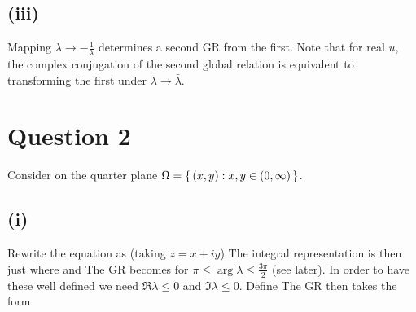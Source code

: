 \documentclass{article}
\begin{document}
\subsection{(iii)}
Mapping $\lambda \to -\frac{1}{\lambda}$ determines a second GR from the first. 
Note that for real $u$, the complex conjugation of the second global relation is equivalent to transforming the first under $\lambda \to \bar{\lambda}$.

\section{Question 2}
Consider 
on the quarter plane $\Omega=\set{(x,y) : x,y\in(0,\infty)}$. 
\subsection{(i)}
Rewrite the equation as (taking $z=x+iy$)
The integral representation is then just 
where 
and 
The GR becomes 
for $\pi \leq \arg \lambda \leq \frac{3\pi}{2}$ (see later).
In order to have these well defined we need $\Re \lambda \leq 0 $ and $\Im \lambda \leq 0 $. Define 
The GR then takes the form 
\end{document}
